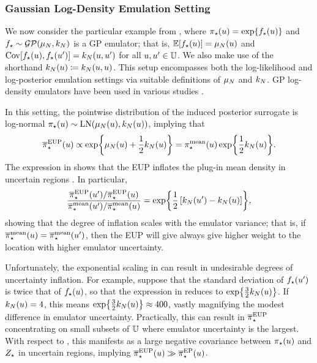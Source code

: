 \documentclass[12pt]{article}
\begin{document}
\subsubsection{Gaussian Log-Density Emulation Setting} \label{sec:ldens-Gaussian}
We now consider the particular example from ,
where ${\pi}_{\star}(u) = \exp\mathopen{}\left\{{f}_{\star}(u)\right\}\mathclose{}$
and ${f}_{\star} \sim \mathcal{GP}(\mu_{N}, k_{N})$ is a GP emulator; that is, 
$\mathbb{E}[{f}_{\star}(u)] = \mu_{N}(u)$ and 
$\mathrm{Cov}[{f}_{\star}(u),{f}_{\star}(u^\prime)] = k_{N}(u, u^\prime)$ for all 
$u, u^\prime \in \mathbb{U}$. We also make use of the shorthand 
$k_{N}(u) \coloneqq k_{N}(u, u)$. This setup encompasses both the log-likelihood
and log-posterior emulation settings via suitable definitions of $\mu_{N}$ and $k_{N}$.
GP log-density emulators have been used in various studies 
\citep{VehtariParallelGP,FATES_CES,trainDynamics,quantileApprox,ActiveLearningMCMC,FerEmulation,
StuartTeck1,random_fwd_models,GP_PDE_priors,OakleyllikEm,JosephMinEnergy,AlawiehIterativeGP}.

In this setting, the pointwise distribution of the induced posterior surrogate is log-normal
${\pi}_{\star}(u) \sim \mathrm{LN}(\mu_{N}(u), k_{N}(u))$, implying that
\begin{equation}
{\overline{\pi}}_{\star}^{\mathrm{EUP}}(u) 
\propto \exp\mathopen{}\left\{\mu_{N}(u) + \frac{1}{2}k_{N}(u)\right\}\mathclose{}
= {\pi}_{\star}^{\mathrm{mean}}(u) \exp\mathopen{}\left\{\frac{1}{2}k_{N}(u)\right\}\mathclose{}.
\label{eq:EUP-Gaussian-ldens}
\end{equation} 
The expression in  shows that the EUP inflates the plug-in mean 
density in uncertain regions \citep{StuartTeck2,GP_PDE_priors}. In particular, 
 \begin{equation}
 \frac{{\overline{\pi}}_{\star}^{\mathrm{EUP}}(u^\prime)/{\overline{\pi}}_{\star}^{\mathrm{EUP}}(u)}{{\overline{\pi}}_{\star}^{\mathrm{mean}}(u^\prime)/{\overline{\pi}}_{\star}^{\mathrm{mean}}(u)}
 = \exp\mathopen{}\left\{\frac{1}{2}\left[k_{N}(u^\prime) - k_{N}(u) \right]\right\}\mathclose{},
 \label{eq:unc-infl-factor}
 \end{equation}
showing that the degree of inflation scales with the emulator variance; that is, if 
${\overline{\pi}}_{\star}^{\mathrm{mean}}(u)={\overline{\pi}}_{\star}^{\mathrm{mean}}(u^\prime)$, then the EUP will give 
always give higher weight to the location with higher emulator uncertainty.

Unfortunately, the exponential scaling in  can result in
undesirable degrees of uncertainty inflation. For example, suppose that 
the standard deviation of ${f}_{\star}(u^\prime)$ is twice that of ${f}_{\star}(u)$, so that 
the expression in  reduces to $\exp\mathopen{}\left\{\frac{3}{2}k_{N}(u)\right\}\mathclose{}$.
If $k_{N}(u) = 4$, this means
$\exp\mathopen{}\left\{\frac{3}{2}k_{N}(u)\right\}\mathclose{} \approx 400$, vastly magnifying the modest difference 
in emulator uncertainty. Practically, this can result in ${\overline{\pi}}_{\star}^{\mathrm{EUP}}$ concentrating 
on small subsets of $\mathbb{U}$ where emulator uncertainty is the largest.
With respect to , this manifests as a large negative covariance 
between ${\pi}_{\star}(u)$ and ${Z}_{\star}$ in uncertain regions, implying 
${\overline{\pi}}_{\star}^{\mathrm{EUP}}(u) \gg {\overline{\pi}}_{\star}^{\mathrm{EP}}(u)$. 
\end{document}
